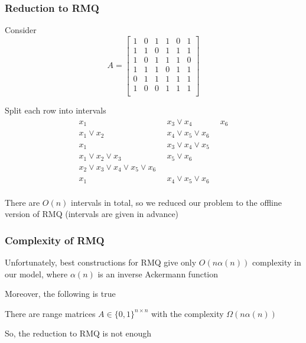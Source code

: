 \documentclass{beamer}
\begin{document}
\begin{frame}
\frametitle{Reduction to RMQ}

Consider
\[
 A =\begin{bmatrix}
    1 & 0 & 1 & 1 & 0 & 1 \\
    1 & 1 & 0 & 1 & 1 & 1 \\
    1 & 0 & 1 & 1 & 1 & 0 \\
    1 & 1 & 1 & 0 & 1 & 1 \\
    0 & 1 & 1 & 1 & 1 & 1 \\
    1 & 0 & 0 & 1 & 1 & 1 \\
    \end{bmatrix}
\]

Split each row into intervals
\[
\begin{array}{lll}
    x_1 & \phantom{0}x_3 \vee x_4 & \phantom{0}x_6 \\
    x_1 \vee x_2& \phantom{0}x_4\vee x_5 \vee x_6 & \\
    x_1& \phantom{0}x_3\vee x_4 \vee x_5 &\\
    x_1\vee x_2 \vee x_3& \phantom{0}x_5 \vee x_6 &\\
    x_2\vee x_3 \vee x_4\vee x_5 \vee x_6 &&\\
    x_1& \phantom{0}x_4 \vee x_5\vee x_6 &\\
    \end{array}
\]

There are $O(n)$ intervals in total, so we reduced our problem to the offline version of RMQ (intervals are given in advance)


\end{frame}


\begin{frame}
\frametitle{Complexity of RMQ}

Unfortunately, best constructions for RMQ give only $O(n \alpha(n))$ complexity in our model, where $\alpha(n)$ is an inverse Ackermann function


\pause
\medskip
Moreover, the following is true
\begin{theorem}
There are range matrices $A\in \{0,1\}^{n\times n}$ with the complexity $\Omega(n \alpha(n))$
\end{theorem}

So, the reduction to RMQ is not enough


\end{frame}
\end{document}
